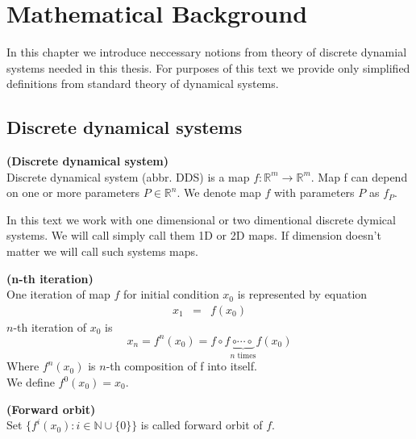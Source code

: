 \chapter{Mathematical Background}
In this chapter we introduce neccessary notions from theory of discrete dynamial systems needed in this thesis.
For purposes of this text we provide only simplified definitions from standard theory of dynamical systems.

\section{Discrete dynamical systems}

\begin{definition} \textbf{(Discrete dynamical system)} \\
    Discrete dynamical system (abbr. DDS) is a map $f: \mathbb{R}^{m} \rightarrow \mathbb{R}^{m}$.
    Map f can depend on one or more parameters $P \in \mathbb{R}^n$.
    We denote map $f$ with parameters $P$ as $f_P$.
\end{definition}

\begin{remark}
    In this text we work with one dimensional or two dimentional discrete dymical systems.
    We will call simply call them 1D or 2D maps.
    If dimension doesn't matter we will call such systems maps.
\end{remark}

\begin{definition} \textbf{(n-th iteration)} \\
    One iteration of map $f$ for initial condition $x_0$ is represented by equation
    \begin{eqnarray}
        x_{1}  & = & f(x_{0})
    \end{eqnarray}
    $n$-th iteration of $x_0$ is
    \begin{equation}
        x_{n} = f^{n}(x_0) = f \circ f \underbrace{\circ \cdots \circ}_\text{$n$ times} f(x_0)
    \end{equation}
    Where $f^{n}(x_0)$ is $n$-th composition of f into itself. \\
    We define $f^{0}(x_0) = x_0$.
\end{definition}

\begin{definition} \textbf{(Forward orbit)} \\
    Set $\{f^i(x_0):i \in \mathbb{N} \cup \{0\} \}$ is called forward orbit of $f$.
\end{definition}

